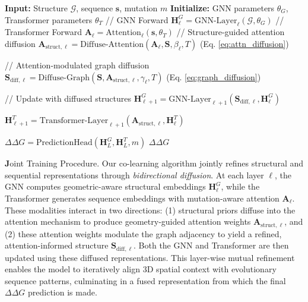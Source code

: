 \documentclass[11pt]{article}
\begin{document}
\begin{algorithm}
\caption{Co-Learning via Bidirectional Diffusion}
\begin{algorithmic}[1]
\STATE \textbf{Input:} Structure $\mathcal{G}$, sequence $\mathbf{s}$, mutation $m$
\STATE \textbf{Initialize:} GNN parameters $\theta_G$, Transformer parameters $\theta_T$
    \STATE // GNN Forward
    \STATE $\mathbf{H}^G_\ell = \text{GNN-Layer}_\ell(\mathcal{G}, \theta_G)$
    \STATE // Transformer Forward  
    \STATE $\mathbf{A}_\ell = \text{Attention}_\ell(\mathbf{s}, \theta_T)$
    \STATE // Structure-guided attention diffusion
    \STATE $\mathbf{A}_{\text{struct}, \ell} =
    \text{Diffuse-Attention}(\mathbf{A}_\ell, \mathbf{S}, \beta_\ell, T)$ \quad
    (Eq. \ref{eq:attn_diffusion})

    \STATE // Attention-modulated graph diffusion
    \STATE $\mathbf{S}_{\text{diff}, \ell} = \text{Diffuse-Graph}(\mathbf{S},
    \mathbf{A}_{\text{struct}, \ell}, \gamma_\ell, T)$ \quad (Eq.
    \ref{eq:graph_diffusion})

    \STATE // Update with diffused structures
    \STATE $\mathbf{H}^G_{\ell+1} =
    \text{GNN-Layer}_{\ell+1}(\mathbf{S}_{\text{diff}, \ell},
    \mathbf{H}^G_\ell)$

    \STATE $\mathbf{H}^T_{\ell+1} =
    \text{Transformer-Layer}_{\ell+1}(\mathbf{A}_{\text{struct}, \ell},
    \mathbf{H}^T_\ell)$

\ENDFOR
\STATE $\Delta \Delta G = \text{PredictionHead}(\mathbf{H}^G_L, \mathbf{H}^T_L, m)$
\RETURN $\Delta \Delta G$
\end{algorithmic}
\end{algorithm}

{\textbf Joint Training Procedure.} 
Our co-learning algorithm jointly refines structural and sequential
representations through \textit{bidirectional diffusion}. At each layer $\ell$,
the GNN computes geometric-aware structural embeddings $\mathbf{H}^G_\ell$,
while the Transformer generates sequence embeddings with mutation-aware
attention $\mathbf{A}_\ell$. These modalities interact in two directions: (1)
structural priors diffuse into the attention mechanism to produce
geometry-guided attention weights $\mathbf{A}_{\text{struct},\ell}$, and (2)
these attention weights modulate the graph adjacency to yield a refined,
attention-informed structure $\mathbf{S}_{\text{diff},\ell}$. Both the GNN and
Transformer are then updated using these diffused representations. This
layer-wise mutual refinement enables the model to iteratively align 3D spatial
context with evolutionary sequence patterns, culminating in a fused
representation from which the final $\Delta\Delta G$ prediction is made.
\end{document}
